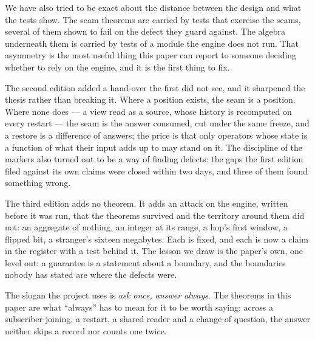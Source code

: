 \documentclass[11pt,a4paper]{article}
\renewcommand{\_}{\oldunderscore\allowbreak}
\begin{document}
We have also tried to be exact about the distance between the design and what the tests show. The seam
theorems are carried by tests that exercise the seams, several of them shown to fail on the defect they
guard against. The algebra underneath them is carried by tests of a module the engine does not run.
That asymmetry is the most useful thing this paper can report to someone deciding whether to rely on
the engine, and it is the first thing to fix.

The second edition added a hand-over the first did not see, and it sharpened the thesis rather than
breaking it. Where a position exists, the seam is a position. Where none does --- a view read as a
source, whose history is recomputed on every restart --- the seam is the answer consumed, cut under the
same freeze, and a restore is a difference of answers; the price is that only operators whose state is a
function of what their input adds up to may stand on it. The discipline of the markers also turned out
to be a way of finding defects: the gaps the first edition filed against its own claims were closed
within two days, and three of them found something wrong.

The third edition adds no theorem. It adds an attack on the engine, written before it was run, that
the theorems survived and the territory around them did not: an aggregate of nothing, an integer at its
range, a hop's first window, a flipped bit, a stranger's sixteen megabytes. Each is fixed, and each is now
a claim in the register with a test behind it. The lesson we draw is the paper's own, one level out: a
guarantee is a statement about a boundary, and the boundaries nobody has stated are where the defects
were.

The slogan the project uses is \emph{ask once, answer always}. The theorems in this paper are what
``always'' has to mean for it to be worth saying: across a subscriber joining, a restart, a shared
reader and a change of question, the answer neither skips a record nor counts one twice.
\end{document}
